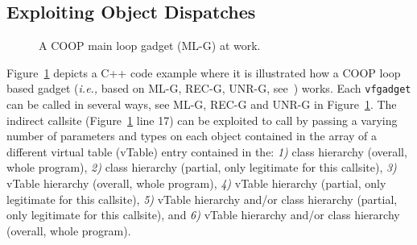 \subsection{Exploiting Object Dispatches}
\label{Exploiting Polymorphism Weaknesses}
 \begin{figure}[!h]
   \vspace{-.37cm}
   \centering
\vspace{-2.6cm}
\caption{A COOP main loop gadget (ML-G) at work.}
\label{Code example used to illustrate how a COOP loop gadget works}
\end{figure}
Figure~\ref{Code example used to illustrate how a COOP loop gadget works}
depicts a C++ code example where it is illustrated how a COOP loop based gadget 
(\textit{i.e.,} based on ML-G, REC-G, UNR-G, see~\cite{crane:readactor++}) works.
Each \texttt{vfgadget}  can be called in several ways, see ML-G, REC-G and UNR-G in 
Figure~\ref{Code example used to illustrate how a COOP loop gadget works}.
The indirect callsite (Figure~\ref{Code example used to illustrate how a COOP loop gadget works} line 17) can be exploited 
to call by passing a varying number of parameters and types on each object contained in the array of a different
virtual table (vTable) entry contained in the:
\textit{1)} class hierarchy (overall, whole program),
\textit{2)} class hierarchy (partial, only legitimate for this callsite),
\textit{3)} vTable hierarchy (overall, whole program),
\textit{4)} vTable hierarchy (partial, only legitimate for this callsite),
\textit{5)} vTable hierarchy and/or class hierarchy (partial, only legitimate for this callsite), and
\textit{6)} vTable hierarchy and/or class hierarchy (overall, whole program).
